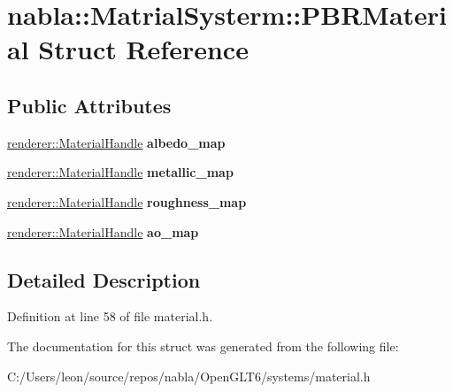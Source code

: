 \hypertarget{structnabla_1_1_matrial_systerm_1_1_p_b_r_material}{}\section{nabla\+::Matrial\+Systerm\+::P\+B\+R\+Material Struct Reference}
\label{structnabla_1_1_matrial_systerm_1_1_p_b_r_material}
\subsection*{Public Attributes}
\begin{DoxyCompactItemize}
\item 
\mbox{\label{structnabla_1_1_matrial_systerm_1_1_p_b_r_material_afcaa76f6df2cef2f06355f2f9d787a9a}} 
\mbox{\hyperlink{classnabla_1_1renderer_1_1_handle}{renderer\+::\+Material\+Handle}} {\bfseries albedo\+\_\+map}
\item 
\mbox{\label{structnabla_1_1_matrial_systerm_1_1_p_b_r_material_a965ea4b96d7d97f84d96188f652f3bf2}} 
\mbox{\hyperlink{classnabla_1_1renderer_1_1_handle}{renderer\+::\+Material\+Handle}} {\bfseries metallic\+\_\+map}
\item 
\mbox{\label{structnabla_1_1_matrial_systerm_1_1_p_b_r_material_a4475aedbf98aeec7208f4bd8bf0654f6}} 
\mbox{\hyperlink{classnabla_1_1renderer_1_1_handle}{renderer\+::\+Material\+Handle}} {\bfseries roughness\+\_\+map}
\item 
\mbox{\label{structnabla_1_1_matrial_systerm_1_1_p_b_r_material_a50a078b8264b7d47eb0e5d7314d0f334}} 
\mbox{\hyperlink{classnabla_1_1renderer_1_1_handle}{renderer\+::\+Material\+Handle}} {\bfseries ao\+\_\+map}
\end{DoxyCompactItemize}


\subsection{Detailed Description}


Definition at line 58 of file material.\+h.



The documentation for this struct was generated from the following file\+:\begin{DoxyCompactItemize}
\item 
C\+:/\+Users/leon/source/repos/nabla/\+Open\+G\+L\+T6/systems/material.\+h\end{DoxyCompactItemize}
